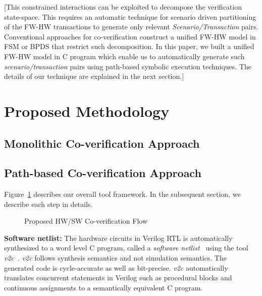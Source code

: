 \documentclass[sigconf]{acmart}
\newcommand{\rmcmt}[1]{{\color{magenta} [{#1}]}}
\newcommand{\Omit}[1]{}
\begin{document}
\rmcmt{This constrained interactions can be exploited 
to decompose the verification state-space. 
This requires an automatic technique for scenario driven 
partitioning of the FW-HW transactions to generate only 
relevant {\em Scenario/Transaction} pairs. Conventional 
approaches for co-verification construct a unified 
FW-HW model in FSM or BPDS that restrict such decomposition. 
In this paper, we built a unified FW-HW model in C program 
which enable us to automatically generate such {\em scenario/transaction} 
pairs using path-based symbolic execution techniques. The details 
of our technique are explained in the next section.}
%
\Omit{
\textbf{Problem Statement}
Given a FW model in C, HW models in Verilog RTL, a property $\psi$ and 
a set of scenarios, the goal is to check whether $\psi$ holds under all 
scenarios in the combined FW-HW model. 
}
%
\section{Proposed Methodology}

\subsection{Monolithic Co-verification Approach}

\subsection{Path-based Co-verification Approach}
%
Figure~\ref{proposed-flow} describes our overall tool framework. In the
subsequent section, we describe each step in details. 

\begin{figure}[t]
{}
\caption{Proposed HW/SW Co-verification Flow
\label{proposed-flow}}
\end{figure}

{\bf Software netlist:}
The hardware circuits in Verilog RTL is automatically 
synthesized to a word level C program, called a 
\textit{software netlist}~\cite{mtk2016,mskm2016} using the 
tool {\em v2c}~\cite{mtk2016}. {\em v2c} follows synthesis semantics and not 
simulation semantics. The generated code is cycle-accurate as well as 
bit-precise. {\em v2c} automatically translates concurrent statements 
in Verilog such as procedural blocks and continuous assignments to 
a semantically equivalent C program. 
 
\end{document}
